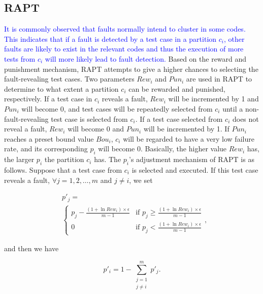 \documentclass[10pt,journal,compsoc]{IEEEtran}
\begin{document}
\subsection{RAPT}
\textcolor{blue}{It is commonly observed that faults normally intend to cluster in some codes. This indicates that if a fault is detected by a test case in a partition $c_i$, other faults are likely to exist in the relevant codes and thus the execution of more tests from $c_i$ will more likely lead to fault detection.}
Based on the reward and punishment mechanism, RAPT attempts to give a higher chances to selecting the fault-revealing test cases. Two parameters $Rew_i$ and $Pun_i$ are used in RAPT to determine to what extent a partition $c_i$ can be rewarded and punished, respectively. If a test case in $c_i$ reveals a fault, $Rew_i$ will be incremented by 1 and $Pun_i$ will become 0, and test cases will be repeatedly selected from $c_i$ until a non-fault-revealing test case is selected from $c_i$. If a test case selected from $c_i$ does not reveal a fault, $Rew_i$ will become 0 and $Pun_i$ will be incremented by 1. If $Pun_i$ reaches a preset bound value $Bou_i$, $c_i$ will be regarded to have a very low failure rate, and its corresponding $p_i$ will become 0.
Basically, the higher value $Rew_i$ has, the larger $p_i$ the partition $c_i$ has. The $p_i$'s adjustment mechanism of RAPT is as follows. Suppose that a test case from $c_i$ is selected and executed. If this test case reveals a fault, $\forall j = 1, 2, \ldots, m$ and $j \neq i$, we set

\begin{equation}
\label{eq:RAPThitJ}
\begin{split}
& p'_j = \\
& \begin{cases}
p_j - \displaystyle\frac{(1 + \ln Rew_i) \times \epsilon}{m-1} & \text{if } p_j \geq \displaystyle\frac{(1 + \ln Rew_i) \times \epsilon}{m-1} \\
0 & \text{if } p_j < \displaystyle\frac{(1 + \ln Rew_i) \times \epsilon}{m-1}
\end{cases},
\end{split}
\end{equation}

and then we have

\begin{equation}
\label{eq:RAPThitI}
p'_i = 1 - \sum_{\substack{j = 1 \\ j \neq i}}^m p'_j.
\end{equation}
\end{document}

